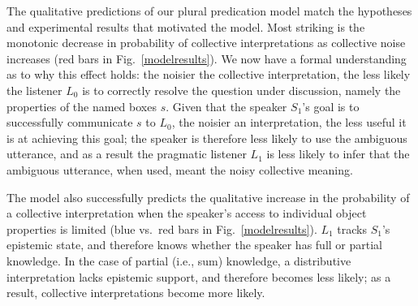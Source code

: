 \documentclass[preprint,12pt,authoryear,titlepage]{elsarticle}
\begin{document}


The qualitative predictions of our plural predication model match the hypotheses and experimental results that motivated the model. Most striking is the monotonic decrease in probability of collective interpretations as collective noise increases (red bars in  Fig.~\ref{modelresults}). We now have a formal understanding as to why this effect holds: the noisier the collective interpretation, the less likely the listener $L_{0}$ is to correctly resolve the question under discussion, namely the properties of the named boxes $s$. Given that the speaker $S_{1}$'s goal is to successfully communicate $s$ to $L_{0}$, the noisier an interpretation, the less useful it is at achieving this goal; the speaker is therefore less likely to use the ambiguous utterance, and as a result the pragmatic listener $L_{1}$ is less likely to infer that the ambiguous utterance, when used, meant the noisy collective meaning.

The model also successfully predicts the qualitative increase in the probability of a collective interpretation when the speaker's  access to individual object properties is limited (blue vs.~red bars in  Fig.~\ref{modelresults}). %
$L_{1}$ tracks  $S_{1}$'s epistemic state, and therefore knows whether the speaker has full or partial knowledge. In the case of partial (i.e., sum)  knowledge, a distributive interpretation lacks epistemic support, and therefore becomes less likely; as a result, collective interpretations become more likely.

\end{document}
